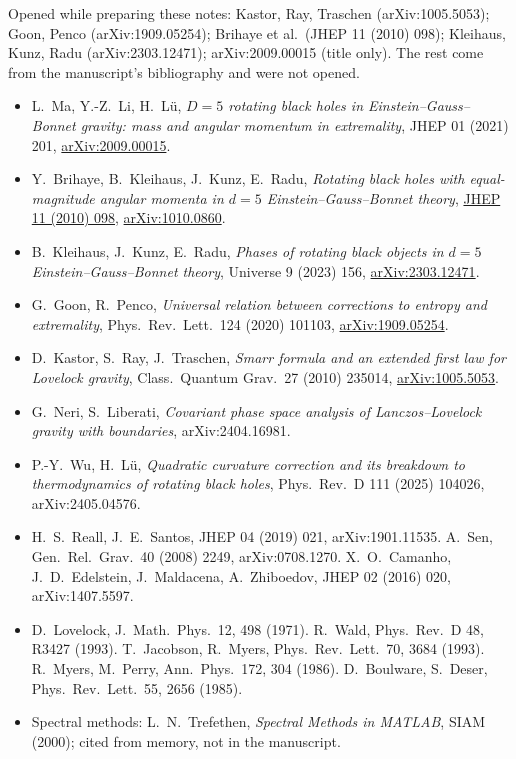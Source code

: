 \documentclass[12pt,a4paper]{article}
\begin{document}
Opened while preparing these notes: Kastor, Ray, Traschen (arXiv:1005.5053);
Goon, Penco (arXiv:1909.05254); Brihaye et al.\ (JHEP 11 (2010) 098);
Kleihaus, Kunz, Radu (arXiv:2303.12471); arXiv:2009.00015 (title only). The rest
come from the manuscript's bibliography and were not opened.
\begin{itemize}[nosep]
\item L.~Ma, Y.-Z.~Li, H.~L\"u, \emph{$D=5$ rotating black holes in Einstein--Gauss--Bonnet gravity: mass and angular momentum in extremality}, JHEP 01 (2021) 201, \href{https://arxiv.org/abs/2009.00015}{arXiv:2009.00015}.
\item Y.~Brihaye, B.~Kleihaus, J.~Kunz, E.~Radu, \emph{Rotating black holes with equal-magnitude angular momenta in $d=5$ Einstein--Gauss--Bonnet theory}, \href{https://doi.org/10.1007/JHEP11(2010)098}{JHEP 11 (2010) 098}, \href{https://arxiv.org/abs/1010.0860}{arXiv:1010.0860}.
\item B.~Kleihaus, J.~Kunz, E.~Radu, \emph{Phases of rotating black objects in $d=5$ Einstein--Gauss--Bonnet theory}, Universe 9 (2023) 156, \href{https://arxiv.org/abs/2303.12471}{arXiv:2303.12471}.
\item G.~Goon, R.~Penco, \emph{Universal relation between corrections to entropy and extremality}, Phys.\ Rev.\ Lett.\ 124 (2020) 101103, \href{https://arxiv.org/abs/1909.05254}{arXiv:1909.05254}.
\item D.~Kastor, S.~Ray, J.~Traschen, \emph{Smarr formula and an extended first law for Lovelock gravity}, Class.\ Quantum Grav.\ 27 (2010) 235014, \href{https://arxiv.org/abs/1005.5053}{arXiv:1005.5053}.
\item G.~Neri, S.~Liberati, \emph{Covariant phase space analysis of Lanczos--Lovelock gravity with boundaries}, arXiv:2404.16981.
\item P.-Y.~Wu, H.~L\"u, \emph{Quadratic curvature correction and its breakdown to thermodynamics of rotating black holes}, Phys.\ Rev.\ D 111 (2025) 104026, arXiv:2405.04576.
\item H.~S.~Reall, J.~E.~Santos, JHEP 04 (2019) 021, arXiv:1901.11535. A.~Sen, Gen.\ Rel.\ Grav.\ 40 (2008) 2249, arXiv:0708.1270. X.~O.~Camanho, J.~D.~Edelstein, J.~Maldacena, A.~Zhiboedov, JHEP 02 (2016) 020, arXiv:1407.5597.
\item D.~Lovelock, J.\ Math.\ Phys.\ 12, 498 (1971). R.~Wald, Phys.\ Rev.\ D 48, R3427 (1993). T.~Jacobson, R.~Myers, Phys.\ Rev.\ Lett.\ 70, 3684 (1993). R.~Myers, M.~Perry, Ann.\ Phys.\ 172, 304 (1986). D.~Boulware, S.~Deser, Phys.\ Rev.\ Lett.\ 55, 2656 (1985).
\item Spectral methods: L.~N.~Trefethen, \emph{Spectral Methods in MATLAB}, SIAM (2000); cited from memory, not in the manuscript.
\end{itemize}
\end{document}
